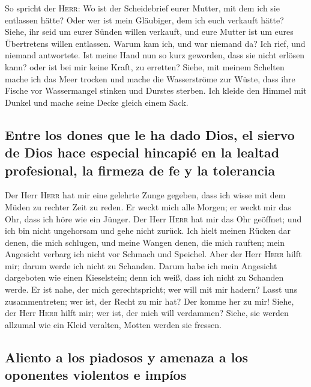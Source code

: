  So spricht der \textsc{Herr}: Wo ist der Scheidebrief
eurer Mutter, mit dem ich sie entlassen hätte? Oder wer ist mein
Gläubiger, dem ich euch verkauft hätte? Siehe, ihr seid um eurer Sünden
willen verkauft, und eure Mutter ist um eures Übertretens willen
entlassen.  Warum kam ich, und war niemand da? Ich rief,
und niemand antwortete. Ist meine Hand nun so kurz geworden, dass sie
nicht erlösen kann? oder ist bei mir keine Kraft, zu erretten? Siehe,
mit meinem Schelten mache ich das Meer trocken und mache die
Wasserströme zur Wüste, dass ihre Fische vor Wassermangel stinken und
Durstes sterben.  Ich kleide den Himmel mit Dunkel und
mache seine Decke gleich einem Sack.

\hypertarget{entre-los-dones-que-le-ha-dado-dios-el-siervo-de-dios-hace-especial-hincapiuxe9-en-la-lealtad-profesional-la-firmeza-de-fe-y-la-tolerancia}{%
\subsection{Entre los dones que le ha dado Dios, el siervo de Dios hace
especial hincapié en la lealtad profesional, la firmeza de fe y la
tolerancia}\label{entre-los-dones-que-le-ha-dado-dios-el-siervo-de-dios-hace-especial-hincapiuxe9-en-la-lealtad-profesional-la-firmeza-de-fe-y-la-tolerancia}}

 Der Herr \textsc{Herr} hat mir eine gelehrte Zunge
gegeben, dass ich wisse mit dem Müden zu rechter Zeit zu reden. Er weckt
mich alle Morgen; er weckt mir das Ohr, dass ich höre wie ein Jünger.
 Der Herr \textsc{Herr} hat mir das Ohr geöffnet; und ich
bin nicht ungehorsam und gehe nicht zurück.  Ich hielt
meinen Rücken dar denen, die mich schlugen, und meine Wangen denen, die
mich rauften; mein Angesicht verbarg ich nicht vor Schmach und Speichel.
 Aber der Herr \textsc{Herr} hilft mir; darum werde ich
nicht zu Schanden. Darum habe ich mein Angesicht dargeboten wie einen
Kieselstein; denn ich weiß, dass ich nicht zu Schanden werde.
 Er ist nahe, der mich gerechtspricht; wer will mit mir
hadern? Lasst uns zusammentreten; wer ist, der Recht zu mir hat? Der
komme her zu mir!  Siehe, der Herr \textsc{Herr} hilft
mir; wer ist, der mich will verdammen? Siehe, sie werden allzumal wie
ein Kleid veralten, Motten werden sie fressen.

\hypertarget{aliento-a-los-piadosos-y-amenaza-a-los-oponentes-violentos-e-impuxedos}{%
\subsection{Aliento a los piadosos y amenaza a los oponentes violentos e
impíos}\label{aliento-a-los-piadosos-y-amenaza-a-los-oponentes-violentos-e-impuxedos}}

